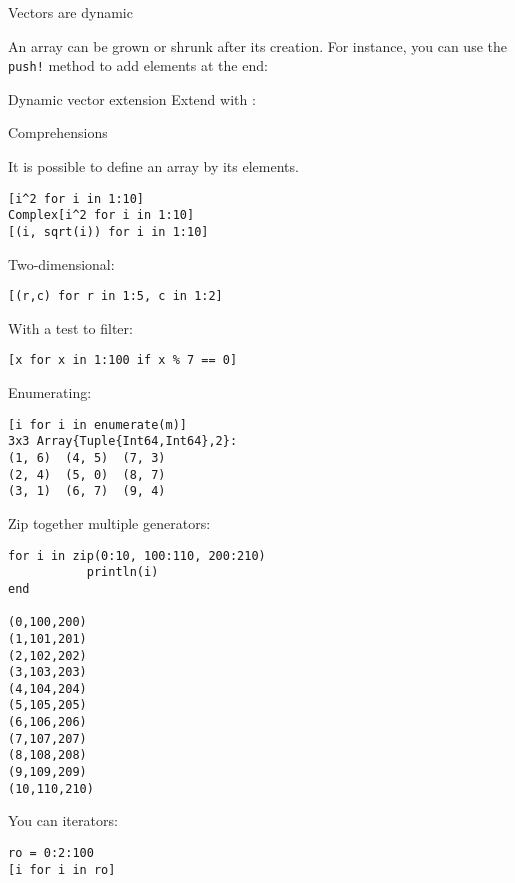 
 {Vectors are dynamic}
\label{sec:vectorj-dynamic}

  An array
  can be grown or shrunk after its creation.
  For instance, you can use the \lstinline{push!} method to add elements at the end:

\begin{block}{Dynamic vector extension}
    \label{sl:vectorj-dynamic}
    Extend with :
\end{block}

 {Comprehensions}

It is possible to define an array by its elements.
\begin{lstlisting}
[i^2 for i in 1:10]
Complex[i^2 for i in 1:10]
[(i, sqrt(i)) for i in 1:10]
\end{lstlisting}

Two-dimensional:
\begin{lstlisting}
[(r,c) for r in 1:5, c in 1:2]
\end{lstlisting}

With a test to filter:
\begin{lstlisting}
[x for x in 1:100 if x % 7 == 0]
\end{lstlisting}

Enumerating:
\begin{lstlisting}
[i for i in enumerate(m)]
3x3 Array{Tuple{Int64,Int64},2}:
(1, 6)  (4, 5)  (7, 3)
(2, 4)  (5, 0)  (8, 7)
(3, 1)  (6, 7)  (9, 4)
\end{lstlisting}

Zip together multiple generators:
\begin{lstlisting}
for i in zip(0:10, 100:110, 200:210)
           println(i) 
end

(0,100,200)
(1,101,201)
(2,102,202)
(3,103,203)
(4,104,204)
(5,105,205)
(6,106,206)
(7,107,207)
(8,108,208)
(9,109,209)
(10,110,210)
\end{lstlisting}

You can iterators:
\begin{lstlisting}
ro = 0:2:100
[i for i in ro]
\end{lstlisting}


